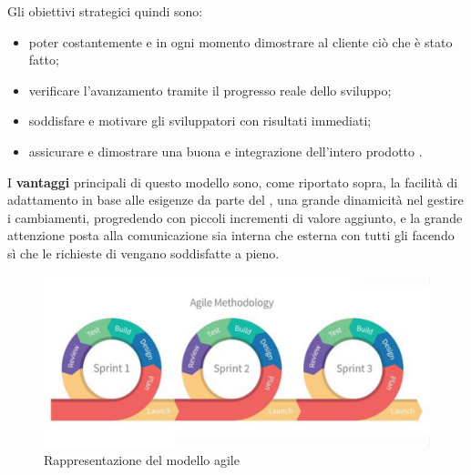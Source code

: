 Gli obiettivi strategici quindi sono:
\begin{itemize}
    \item poter costantemente e in ogni momento dimostrare al cliente ciò che è stato fatto;
    \item verificare l’avanzamento tramite il progresso reale dello sviluppo;
    \item soddisfare e motivare gli sviluppatori con risultati immediati;
    \item assicurare e dimostrare una buona  e integrazione dell’intero prodotto .
\end{itemize}
I \textbf{vantaggi} principali di questo modello sono, come riportato sopra, la facilità di adattamento in base alle esigenze da parte del , 
una grande dinamicità nel gestire i cambiamenti, progredendo con piccoli incrementi di valore aggiunto,
e la grande attenzione posta alla comunicazione sia interna che esterna con tutti gli  facendo sì che le richieste di \proponente{} vengano soddisfatte a pieno.

\begin{figure}[H]
    \centering
    \includegraphics[scale = 0.25]{components/img/agile.png}
    \caption{Rappresentazione del modello agile}
    \label{fig:Rappresentazione del modello agile}
\end{figure}


